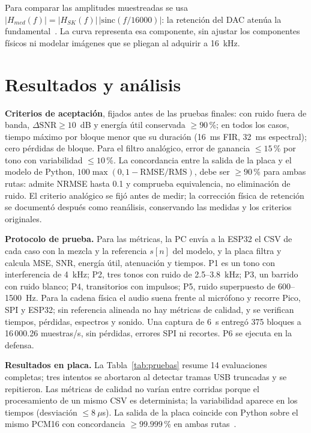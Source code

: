 \documentclass[conference]{IEEEtran}
\begin{document}
Para comparar las amplitudes muestreadas se usa
$|H_{med}(f)|=|H_{SK}(f)|\,|\mathrm{sinc}(f/16000)|$: la retención del DAC atenúa
la fundamental~\cite{dacretencion}. La curva representa esa componente, sin ajustar
los componentes físicos ni modelar imágenes que se pliegan al adquirir a 16~kHz.

\section{Resultados y análisis}\label{sec:resultados}
\textbf{Criterios de aceptación}, fijados antes de las pruebas finales: con ruido fuera
de banda, $\Delta\mathrm{SNR}\geq10$~dB y energía útil conservada $\geq90$\,\%; en todos
los casos, tiempo máximo por bloque menor que su duración (16~ms FIR, 32~ms espectral);
cero pérdidas de bloque. Para el filtro analógico, error de ganancia $\leq15$\,\% por tono
con variabilidad $\leq10$\,\%. La concordancia entre la salida de la placa y el modelo de
Python, $100\max(0,1-\mathrm{RMSE}/\mathrm{RMS})$, debe ser $\geq90$\,\% para ambas
rutas: admite NRMSE hasta 0.1 y comprueba equivalencia, no eliminación de ruido.
El criterio analógico se fijó antes de medir; la corrección física de retención se
documentó después como reanálisis, conservando las medidas y los criterios originales.

\textbf{Protocolo de prueba.} Para las métricas, la PC envía a la ESP32 el CSV de
cada caso con la mezcla y la referencia $s[n]$ del modelo, y la placa filtra y calcula
MSE, SNR, energía útil, atenuación y tiempos. P1 es un tono con interferencia de
4~kHz; P2, tres tonos con ruido de 2.5--3.8~kHz; P3, un barrido con ruido blanco; P4,
transitorios con impulsos; P5, ruido superpuesto de 600--1500~Hz. Para la cadena
física el audio suena frente al micrófono y recorre Pico, SPI y ESP32; sin referencia
alineada no hay métricas de calidad, y se verifican tiempos, pérdidas, espectros y
sonido. Una captura de 6~s entregó 375 bloques a 16\,000.26 muestras/s, sin pérdidas,
errores SPI ni recortes. P6 se ejecuta en la defensa.

\textbf{Resultados en placa.} La Tabla~\ref{tab:pruebas} resume 14 evaluaciones
completas; tres intentos se abortaron al detectar tramas USB truncadas y se repitieron.
Las métricas de calidad no varían entre corridas porque el procesamiento de un mismo
CSV es determinista; la variabilidad aparece en los tiempos (desviación $\leq8~\mu$s).
La salida de la placa coincide con Python sobre el mismo PCM16 con concordancia
$\geq99.999$\,\% en ambas rutas~\cite{numpy2020,scipy2020}.

\end{document}

